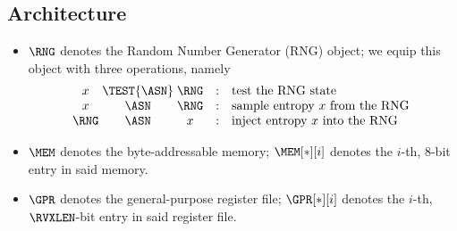 
\subsection{Architecture}

\begin{itemize}

\item $\RNG$
      denotes the Random Number Generator (RNG) object;
      we equip this object with three operations, namely
      \[
      \begin{array}{c@{\;}c@{\;}ccl}
      x    &\TEST{\ASN}& \RNG &:& \mbox{test                    the RNG state} \\
      x    &      \ASN & \RNG &:& \mbox{sample entropy $x$ from the RNG      } \\
      \RNG &      \ASN & x    &:& \mbox{inject entropy $x$ into the RNG      } \\
      \end{array}
      \]
\item $\MEM$
      denotes the byte-addressable memory;
      $\MEM[*][i]$ 
      denotes the $i$-th,
            $8$-bit 
      entry in said memory.
\item $\GPR$ 
      denotes the 
      general-purpose register file;
      $\GPR[*][i]$ 
      denotes the $i$-th,
      $\RVXLEN$-bit
      entry in said register file.

\end{itemize}

